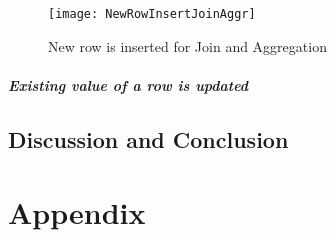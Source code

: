 \documentclass[11pt,a4paper,bibtotoc,idxtotoc,headsepline,footsepline,footexclude,BCOR12mm,DIV13]{scrbook}
\begin{document}
\begin{figure}
	\centering
	\texttt{[image: NewRowInsertJoinAggr]}
	\caption{New row is inserted for Join and Aggregation}
	\label{sec:insertnewrowjoinandaggr}
	
\end{figure}

\newpage

\subsubsection{Existing value of a row is updated}


\newpage
\chapter{Discussion and Conclusion}


		
		\part*{Appendix}
		
		\appendix %
		

  \clearemptydoublepage
  
	
	
 
\end{document}
